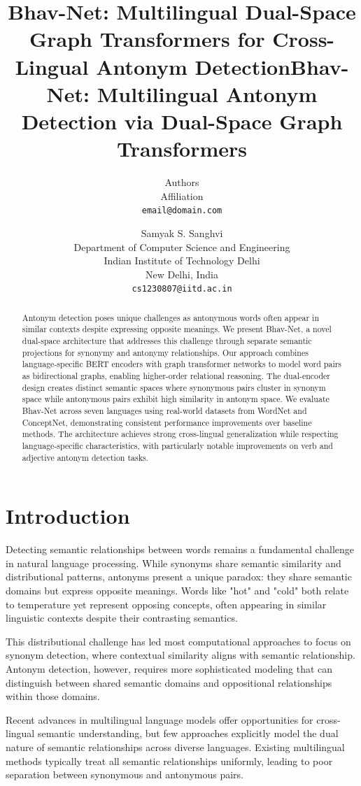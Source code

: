 \documentclass[11pt]{article}
\title{Bhav-Net: Multilingual Dual-Space Graph Transformers for Cross-Lingual Antonym Detection}
\author{Authors \\
  Affiliation \\
  \texttt{email@domain.com}
}
\title{Bhav-Net: Multilingual Antonym Detection via Dual-Space Graph Transformers}
\author{Samyak S. Sanghvi \\
  Department of Computer Science and Engineering \\
  Indian Institute of Technology Delhi \\
  New Delhi, India \\
  \texttt{cs1230807@iitd.ac.in}}
\begin{document}
\maketitle

\begin{abstract}
Antonym detection poses unique challenges as antonymous words often appear in similar contexts despite expressing opposite meanings. We present Bhav-Net, a novel dual-space architecture that addresses this challenge through separate semantic projections for synonymy and antonymy relationships. Our approach combines language-specific BERT encoders with graph transformer networks to model word pairs as bidirectional graphs, enabling higher-order relational reasoning. The dual-encoder design creates distinct semantic spaces where synonymous pairs cluster in synonym space while antonymous pairs exhibit high similarity in antonym space. We evaluate Bhav-Net across seven languages using real-world datasets from WordNet and ConceptNet, demonstrating consistent performance improvements over baseline methods. The architecture achieves strong cross-lingual generalization while respecting language-specific characteristics, with particularly notable improvements on verb and adjective antonym detection tasks.
\end{abstract}

\section{Introduction}

Detecting semantic relationships between words remains a fundamental challenge in natural language processing. While synonyms share semantic similarity and distributional patterns, antonyms present a unique paradox: they share semantic domains but express opposite meanings. Words like "hot" and "cold" both relate to temperature yet represent opposing concepts, often appearing in similar linguistic contexts despite their contrasting semantics.

This distributional challenge has led most computational approaches to focus on synonym detection, where contextual similarity aligns with semantic relationship. Antonym detection, however, requires more sophisticated modeling that can distinguish between shared semantic domains and oppositional relationships within those domains.

Recent advances in multilingual language models offer opportunities for cross-lingual semantic understanding, but few approaches explicitly model the dual nature of semantic relationships across diverse languages. Existing multilingual methods typically treat all semantic relationships uniformly, leading to poor separation between synonymous and antonymous pairs.
\end{document}
